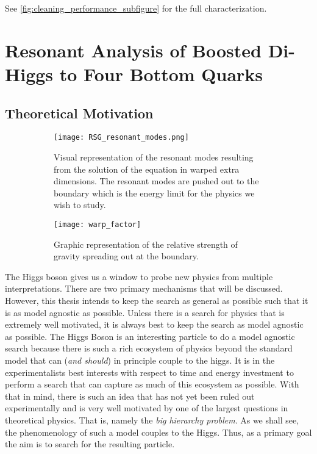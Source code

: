 \documentclass[12pt]{article}
\begin{document}
See \ref{fig:cleaning_performance_subfigure} for the full characterization.
\newpage


\newpage
\section{Resonant Analysis of Boosted Di-Higgs to Four Bottom Quarks}
\subsection{Theoretical Motivation}
\begin{figure}[t]
    \centering
    \begin{subfigure}[t]{.48\textwidth}
        \centering
        \texttt{[image: RSG\_resonant\_modes.png]}
        \caption{
        Visual representation of the resonant modes resulting from the solution
        of the equation in warped extra dimensions. The resonant modes are
        pushed out to the boundary which is the energy limit for the physics we
        wish to study.
        }
        \label{subfig:RSG_resonant_modes}
    \end{subfigure}
    \hfill
    \begin{subfigure}[t]{.48\textwidth}
        \centering
        \texttt{[image: warp\_factor]}
        \caption{Graphic representation of the relative strength of gravity
        spreading out at the boundary.}
        \label{subfig:warp_factor}
    \end{subfigure}
\caption{}
\label{fig:theoretical_motivation_figure}
\end{figure}
The Higgs boson gives us a window to probe new physics from multiple
interpretations. There are two primary mechanisms that will be discussed.
However, this thesis intends to keep the search as general as possible such that
it is as model agnostic as possible. Unless there is a search for physics that
is extremely well motivated, it is always best to keep the search as model
agnostic as possible. The Higgs Boson is an interesting particle to do a model
agnostic search because there is such a rich ecosystem of physics beyond the
standard model that can (\textit{and should}) in principle couple to the higgs.
It is in the experimentalists best interests with respect to time and energy
investment to perform a search that can capture as much of this ecosystem as
possible. With that in mind, there is such an idea that has not yet been ruled
out experimentally and is very well motivated by one of the largest questions in
theoretical physics. That is, namely the \textit{big hierarchy problem}. As we
shall see, the phenomenology of such a model couples to the Higgs. Thus, as a
primary goal the aim is to search for the resulting particle.
\end{document}

